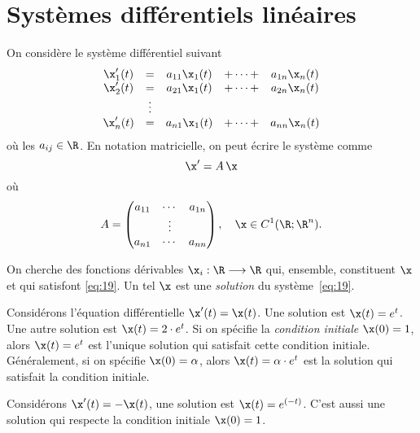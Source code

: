 \chapter{Systèmes différentiels linéaires}
\label{cha:syst-diff-line}

On considère le système différentiel suivant
\begin{equation}
  \label{eq:19}
  \begin{array}{ccccc}
    \x'_1(t) & = &a_{11}\x_1(t) & + \cdots + & a_{1n}\x_n(t) \\
    \x'_2(t) & = &a_{21}\x_1(t) & + \cdots + & a_{2n}\x_n(t) \\
            & \vdots \\             
    \x'_n(t) & = &a_{n1}\x_1(t) & + \cdots + & a_{nn}\x_n(t)
  \end{array}
\end{equation}
où les $a_{ij} \in \R$.  
En notation matricielle, on peut écrire le système comme
\begin{displaymath}
  \x' = A\,\x
\end{displaymath}
où 
\begin{displaymath}
  A =
  \begin{pmatrix}
    a_{11} & \cdots & a_{1n}\\
          & \vdots & \\
          a_{n1} & \cdots & a_{nn}\\          
  \end{pmatrix}, \quad \x \in C^{1}(\R; \R^{n}).
\end{displaymath}

On cherche des fonctions dérivables $\x_i: \R \longrightarrow \R$  qui, ensemble, constituent $\x$ et qui  satisfont \eqref{eq:19}. Un tel $\x$ est une \emph{solution} du système~\eqref{eq:19}. 



\begin{example}
  \label{exe:49}
  Considérons l'équation différentielle $\x'(t) = \x(t)$. Une solution est $\x(t) = e^t$. Une autre solution est $\x(t) = 2\cdot e^t$. Si on spécifie la \emph{condition initiale} $\x(0) = 1$, alors $\x(t) = e^t$ est l'unique solution qui satisfait cette condition initiale. Généralement, si on spécifie $\x(0) = \alpha$, alors  $\x(t) = \alpha \cdot e^t$ est la solution qui satisfait la condition initiale. 

Considérons $\x'(t) = -\x(t)$, une solution est $\x(t) = e^{(-t)}$. %
C'est aussi une solution qui respecte la condition initiale $\x(0) = 1$. 
\end{example}



